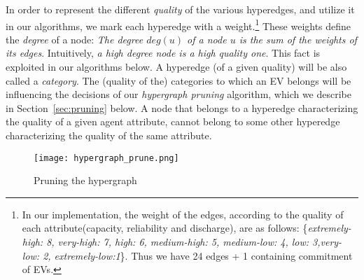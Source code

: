 In order to represent the different {\em quality} of the various hyperedges, and utilize it in our algorithms, we mark each hyperedge with a weight.\footnote{In our implementation, the weight of the edges, according to the quality of each attribute(capacity, reliability and discharge), are as follows: \{\textit{extremely-high: 8, very-high: 7, high: 6, medium-high: 5, medium-low: 4, low: 3,very-low: 2, extremely-low:1}\}. Thus we have 24 edges + 1 containing commitment of EVs.} These weights define the \textit{degree} of a node: {\em The degree $deg(u)$ 
	of a node 
	$u$ 
	is the sum of the weights of its edges}. Intuitively, {\em a high degree node is a high quality one}. This fact is exploited in our algorithms below.
A hyperedge (of a given quality) will be also called a {\em category}. The (quality of the) categories to which an EV belongs will be influencing the decisions of our {\em hypergraph pruning} algorithm, which we describe in Section~\ref{sec:pruning} below. A node that belongs to a hyperedge characterizing the quality of a given agent attribute, cannot belong to some other hyperedge characterizing the quality of the same attribute.
\begin{figure}
	\centering
	\centering
	\texttt{[image: hypergraph\_prune.png]}
	\caption{Pruning the hypergraph\label{fig:hypergraph_prune}}
	
\end{figure}

